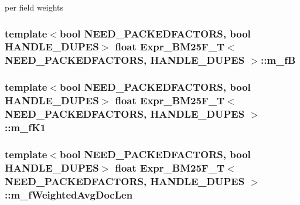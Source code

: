 per field weights 

\hypertarget{structExpr__BM25F__T_aff3a86f844010e800cb1e6532b1950d4}{
\subsubsection[{m\-\_\-f\-B}]{\setlength{\rightskip}{0pt plus 5cm}template$<$bool N\-E\-E\-D\-\_\-\-P\-A\-C\-K\-E\-D\-F\-A\-C\-T\-O\-R\-S, bool H\-A\-N\-D\-L\-E\-\_\-\-D\-U\-P\-E\-S$>$ {\bf float} {\bf Expr\-\_\-\-B\-M25\-F\-\_\-\-T}$<$ N\-E\-E\-D\-\_\-\-P\-A\-C\-K\-E\-D\-F\-A\-C\-T\-O\-R\-S, H\-A\-N\-D\-L\-E\-\_\-\-D\-U\-P\-E\-S $>$\-::m\-\_\-f\-B}}\label{structExpr__BM25F__T_aff3a86f844010e800cb1e6532b1950d4}
\hypertarget{structExpr__BM25F__T_a88d506a5018b8563022d03d74de73835}{
\subsubsection[{m\-\_\-f\-K1}]{\setlength{\rightskip}{0pt plus 5cm}template$<$bool N\-E\-E\-D\-\_\-\-P\-A\-C\-K\-E\-D\-F\-A\-C\-T\-O\-R\-S, bool H\-A\-N\-D\-L\-E\-\_\-\-D\-U\-P\-E\-S$>$ {\bf float} {\bf Expr\-\_\-\-B\-M25\-F\-\_\-\-T}$<$ N\-E\-E\-D\-\_\-\-P\-A\-C\-K\-E\-D\-F\-A\-C\-T\-O\-R\-S, H\-A\-N\-D\-L\-E\-\_\-\-D\-U\-P\-E\-S $>$\-::m\-\_\-f\-K1}}\label{structExpr__BM25F__T_a88d506a5018b8563022d03d74de73835}
\hypertarget{structExpr__BM25F__T_a7120d82bc4cdf4e645b8ff0148fcd0d5}{
\subsubsection[{m\-\_\-f\-Weighted\-Avg\-Doc\-Len}]{\setlength{\rightskip}{0pt plus 5cm}template$<$bool N\-E\-E\-D\-\_\-\-P\-A\-C\-K\-E\-D\-F\-A\-C\-T\-O\-R\-S, bool H\-A\-N\-D\-L\-E\-\_\-\-D\-U\-P\-E\-S$>$ {\bf float} {\bf Expr\-\_\-\-B\-M25\-F\-\_\-\-T}$<$ N\-E\-E\-D\-\_\-\-P\-A\-C\-K\-E\-D\-F\-A\-C\-T\-O\-R\-S, H\-A\-N\-D\-L\-E\-\_\-\-D\-U\-P\-E\-S $>$\-::m\-\_\-f\-Weighted\-Avg\-Doc\-Len}}\label{structExpr__BM25F__T_a7120d82bc4cdf4e645b8ff0148fcd0d5}
